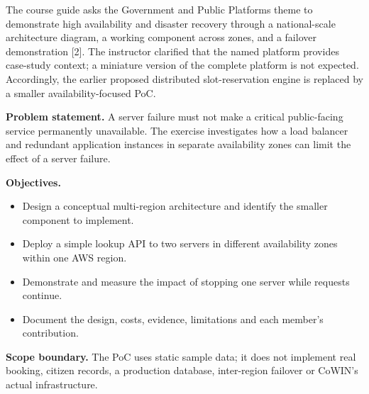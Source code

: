 \documentclass[11pt,a4paper]{article}
\begin{document}
The course guide asks the Government and Public Platforms theme to demonstrate high availability and disaster recovery through a national-scale architecture diagram, a working component across zones, and a failover demonstration [2]. The instructor clarified that the named platform provides case-study context; a miniature version of the complete platform is not expected. Accordingly, the earlier proposed distributed slot-reservation engine is replaced by a smaller availability-focused PoC.

\textbf{Problem statement.} A server failure must not make a critical public-facing service permanently unavailable. The exercise investigates how a load balancer and redundant application instances in separate availability zones can limit the effect of a server failure.

\textbf{Objectives.}
\begin{itemize}
\item Design a conceptual multi-region architecture and identify the smaller component to implement.
\item Deploy a simple lookup API to two servers in different availability zones within one AWS region.
\item Demonstrate and measure the impact of stopping one server while requests continue.
\item Document the design, costs, evidence, limitations and each member's contribution.
\end{itemize}
\textbf{Scope boundary.} The PoC uses static sample data; it does not implement real booking, citizen records, a production database, inter-region failover or CoWIN's actual infrastructure.
\end{document}

